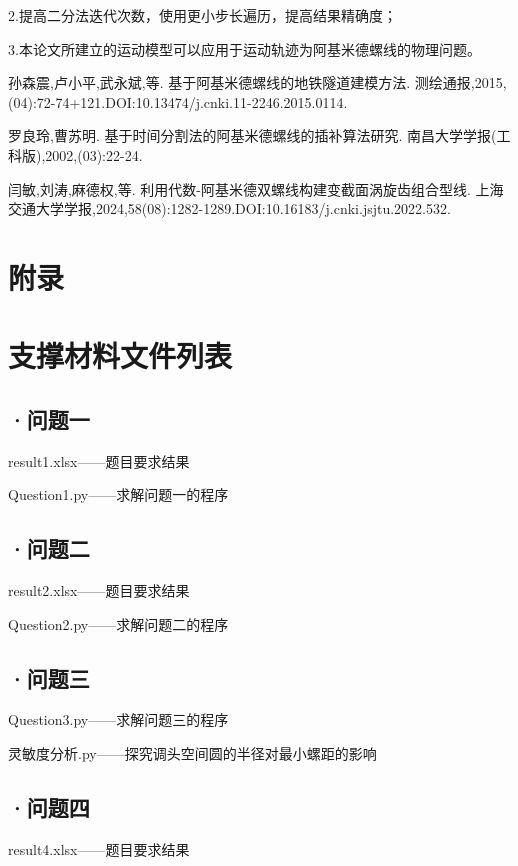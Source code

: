 \documentclass[withoutpreface,bwprint]{cumcmthesis} %
\begin{document}
	2.提高二分法迭代次数，使用更小步长遍历，提高结果精确度；
	
	3.本论文所建立的运动模型可以应用于运动轨迹为阿基米德螺线的物理问题。
	
	
	\begin{thebibliography}{9}%
		孙森震,卢小平,武永斌,等.
		\newblock 基于阿基米德螺线的地铁隧道建模方法\allowbreak[J].
		\newblock 测绘通报,2015,(04):72-74+121.DOI:10.13474/j.cnki.11-2246.2015.0114.
		
		罗良玲,曹苏明.
		\newblock 基于时间分割法的阿基米德螺线的插补算法研究\allowbreak[J].
		\newblock 南昌大学学报(工科版),2002,(03):22-24.
		
		闫敏,刘涛,麻德权,等.
		\newblock 利用代数-阿基米德双螺线构建变截面涡旋齿组合型线\allowbreak[J].
		\newblock 上海交通大学学报,2024,58(08):1282-1289.DOI:10.16183/j.cnki.jsjtu.2022.532.
		

	\end{thebibliography}
	\newpage
	\section*{附录}
	\appendix
	\section{\quad 支撑材料文件列表}
	\subsection*{·问题一}
	result1.xlsx——题目要求结果
	
	Question1.py——求解问题一的程序
	\subsection*{·问题二}
	result2.xlsx——题目要求结果
	
	Question2.py——求解问题二的程序
	\subsection*{·问题三}
	Question3.py——求解问题三的程序
	
	灵敏度分析.py——探究调头空间圆的半径对最小螺距的影响
	\subsection*{·问题四}
	result4.xlsx——题目要求结果
	
\end{document}
